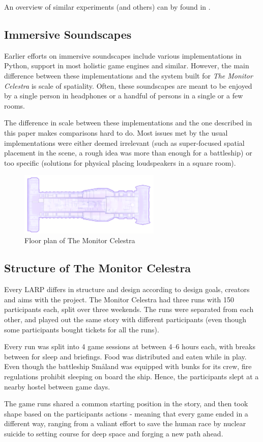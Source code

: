 An overview of similar experiments (and others) can by found in \cite{nordiclarp}.

\subsection{Immersive Soundscapes}
Earlier efforts on immersive soundscapes include various implementations in Python, support in most holistic game engines and similar. However, the main difference between these implementations and the system built for \emph{The Monitor Celestra} is scale of spatiality. Often, these soundscapes are meant to be enjoyed by a single person in headphones or a handful of persons in a single or a few rooms. 

The difference in scale between these implementations and the one described in this paper makes comparisons hard to do. Most issues met by the usual implementations were either deemed irrelevant (such as super-focused spatial placement in the scene, a rough idea was more than enough for a battleship) or too specific (solutions for physical placing loudspeakers in a square room). 

\begin{figure}[H]
  \centering
  \includegraphics[width=0.6\textwidth]{img/ship}
  \caption{Floor plan of The Monitor Celestra}
  \label{fig:celestra}
\end{figure}

\subsection{Structure of The Monitor Celestra}
Every LARP differs in structure and design according to design goals, creators and aims with the project. The Monitor Celestra had three runs with 150 participants each, split over three weekends. The runs were separated from each other, and played out the same story with different participants (even though some participants bought tickets for all the runs). 

Every run was split into 4 game sessions at between 4--6 hours each, with breaks between for sleep and briefings. Food was distributed and eaten while in play. Even though the battleship Småland was equipped with bunks for its crew, fire regulations prohibit sleeping on board the ship. Hence, the participants slept at a nearby hostel between game days.

The game runs shared a common starting position in the story, and then took shape based on the participants actions - meaning that every game ended in a different way, ranging from a valiant effort to save the human race by nuclear suicide to setting course for deep space and forging a new path ahead.



